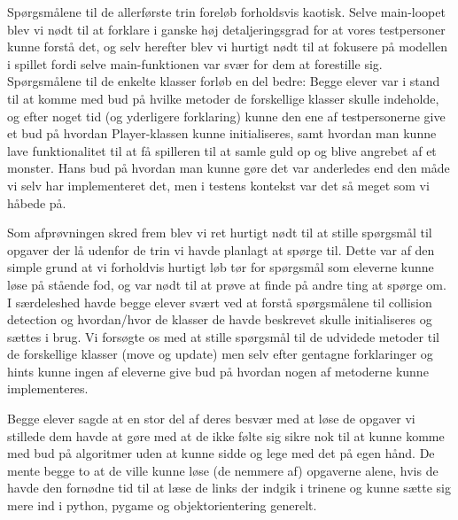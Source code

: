 \documentclass[10pt,a4paper,danish]{article}
\begin{document}
Spørgsmålene til de allerførste trin foreløb forholdsvis kaotisk. Selve main-loopet
blev vi nødt til at forklare i ganske høj detaljeringsgrad for at vores testpersoner
kunne forstå det, og selv herefter blev vi hurtigt nødt til at fokusere på modellen
i spillet fordi selve main-funktionen var svær for dem at forestille sig. Spørgsmålene
til de enkelte klasser forløb en del bedre: Begge elever var i stand til at komme med 
bud på hvilke metoder de forskellige klasser skulle indeholde, og efter noget tid (og
yderligere forklaring) kunne den ene af testpersonerne give et bud på hvordan Player-klassen
kunne initialiseres, samt hvordan man kunne lave funktionalitet til at få spilleren 
til at samle guld op og blive angrebet af et monster. Hans bud på hvordan man kunne gøre 
det var anderledes end den måde vi selv har implementeret det, men i testens kontekst
var det så meget som vi håbede på.

Som afprøvningen skred frem blev vi ret hurtigt nødt til at stille spørgsmål til 
opgaver der lå udenfor de trin vi havde planlagt at spørge til. Dette var af den 
simple grund at vi forholdvis hurtigt løb tør for spørgsmål som eleverne kunne løse
på stående fod, og var nødt til at prøve at finde på andre ting at spørge om. I særdeleshed
havde begge elever svært ved at forstå spørgsmålene til collision detection og 
hvordan/hvor de klasser de havde beskrevet skulle initialiseres og sættes i brug. Vi 
forsøgte os med at stille spørgsmål til de udvidede metoder til de forskellige klasser
(move og update) men selv efter gentagne forklaringer og hints kunne
ingen af eleverne give bud på hvordan nogen af metoderne kunne implementeres. 

Begge elever sagde at en stor del af deres besvær med at løse de opgaver
vi stillede dem havde at gøre med at de ikke følte sig sikre nok til at kunne
komme med bud på algoritmer uden at kunne sidde og lege med det på egen hånd.
De mente begge to at de ville kunne løse (de nemmere af) opgaverne alene, hvis
de havde den fornødne tid til at læse de links der indgik i trinene og kunne
sætte sig mere ind i python, pygame og objektorientering generelt. 
\end{document}

